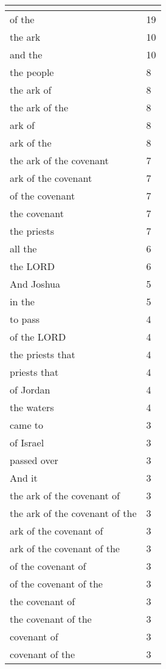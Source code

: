 \begin{center}
\begin{longtable}{|p{3.0in}|p{0.5in}|}
\hline \multicolumn{2}{c}{{ }} \\ \hline
\endfoot 
of the & 19\\ \hline 
the ark & 10\\ \hline 
and the & 10\\ \hline 
the people & 8\\ \hline 
the ark of & 8\\ \hline 
the ark of the & 8\\ \hline 
ark of & 8\\ \hline 
ark of the & 8\\ \hline 
the ark of the covenant & 7\\ \hline 
ark of the covenant & 7\\ \hline 
of the covenant & 7\\ \hline 
the covenant & 7\\ \hline 
the priests & 7\\ \hline 
all the & 6\\ \hline 
the LORD & 6\\ \hline 
And Joshua & 5\\ \hline 
in the & 5\\ \hline 
to pass & 4\\ \hline 
of the LORD & 4\\ \hline 
the priests that & 4\\ \hline 
priests that & 4\\ \hline 
of Jordan & 4\\ \hline 
the waters & 4\\ \hline 
came to & 3\\ \hline 
of Israel & 3\\ \hline 
passed over & 3\\ \hline 
And it & 3\\ \hline 
the ark of the covenant of & 3\\ \hline 
the ark of the covenant of the & 3\\ \hline 
ark of the covenant of & 3\\ \hline 
ark of the covenant of the & 3\\ \hline 
of the covenant of & 3\\ \hline 
of the covenant of the & 3\\ \hline 
the covenant of & 3\\ \hline 
the covenant of the & 3\\ \hline 
covenant of & 3\\ \hline 
covenant of the & 3\\ \hline 

\end{longtable}
\end{center}
